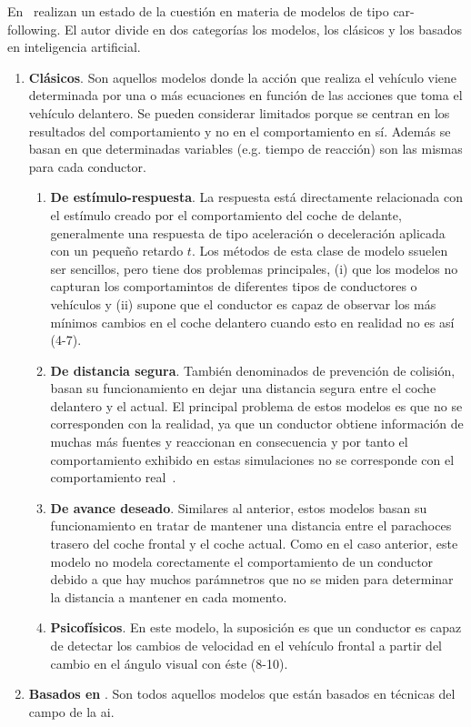 En~\cite{Aghabayk2015} realizan un estado de la cuestión en materia de modelos de tipo car-following. El autor divide en dos categorías los modelos, los clásicos y los basados en inteligencia artificial.

\begin{enumerate}
	\item \textbf{Clásicos}. Son aquellos modelos donde la acción que realiza el vehículo viene determinada por una o más ecuaciones en función de las acciones que toma el vehículo delantero. Se pueden considerar limitados porque se centran en los resultados del comportamiento y no en el comportamiento en sí. Además se basan en que determinadas variables (e.g. tiempo de reacción) son las mismas para cada conductor.
	\begin{enumerate}
		\item \textbf{De estímulo-respuesta}. La respuesta está directamente relacionada con el estímulo creado por el comportamiento del coche de delante, generalmente una respuesta de tipo aceleración o deceleración aplicada con un pequeño retardo $t$. Los métodos de esta clase de modelo ssuelen ser sencillos, pero tiene dos problemas principales, (i) que los modelos no capturan los comportamintos de diferentes tipos de conductores o vehículos y (ii) supone que el conductor es capaz de observar los más mínimos cambios en el coche delantero cuando esto en realidad no es así (4-7).
		\item \textbf{De distancia segura}. También denominados de prevención de colisión, basan su funcionamiento en dejar una distancia segura entre el coche delantero y el actual. El principal problema de estos modelos es que no se corresponden con la realidad, ya que un conductor obtiene información de muchas más fuentes y reaccionan en consecuencia y por tanto el comportamiento exhibido en estas simulaciones no se corresponde con el comportamiento real~\cite{Pipes1953}.
		\item \textbf{De avance deseado}. Similares al anterior, estos modelos basan su funcionamiento en tratar de mantener una distancia entre el parachoces trasero del coche frontal y el coche actual. Como en el caso anterior, este modelo no modela corectamente el comportamiento de un conductor debido a que hay muchos parámnetros que no se miden para determinar la distancia a mantener en cada momento.
		\item \textbf{Psicofísicos}. En este modelo, la suposición es que un conductor es capaz de detectar los cambios de velocidad en el vehículo frontal a partir del cambio en el ángulo visual con éste (8-10).
	\end{enumerate}
	\item \textbf{Basados en }. Son todos aquellos modelos que están basados en técnicas del campo de la \acrshort{ai}.
\end{enumerate}

